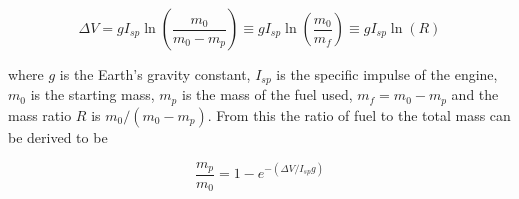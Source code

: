 \begin{equation}
\Delta V = g I_{sp} \ln{\left(\frac{m_0}{m_0-m_p}\right)}\equiv g I_{sp} \ln{\left(\frac{m_0}{m_f}\right)} \equiv g I_{sp} \ln{\left(R\right)}
\label{eqn:tsiolkovsky}
\end{equation}

where $g$ is the Earth's gravity constant, $I_{sp}$ is the specific impulse of the engine, $m_0$ is the starting mass, $m_p$ is the mass of the fuel used, $m_f = m_0-m_p$ and the mass ratio $R$ is  ${m_0}/\left({m_0-m_p}\right)$. From this the ratio of fuel to the total mass can be derived to be

\begin{equation}
\frac{m_p}{m_0} = 1-e^{-\left(\Delta V/I_{sp}g\right)}
\label{eqn:fuelratio}
\end{equation} 